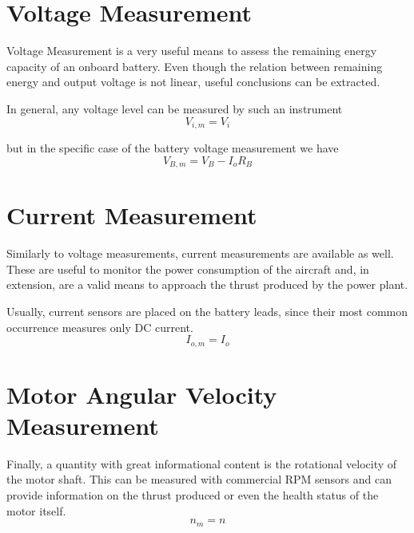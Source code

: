 \section{Voltage Measurement}
Voltage Measurement is a very useful means to assess the remaining energy capacity of an onboard battery. Even though the relation between remaining energy and output voltage is not linear, useful conclusions can be extracted.

In general, any voltage level can be measured by such an instrument
\begin{equation}
	V_{i,m} = V_i
\end{equation}

but in the specific case of the battery voltage measurement we have
\begin{equation}
	V_{B,m} = V_B - I_o R_B
\end{equation}

\section{Current Measurement}
Similarly to voltage measurements, current measurements are available as well. These are useful to monitor the power consumption of the aircraft and, in extension, are a valid means to approach the thrust produced by the power plant.

Usually, current sensors are placed on the battery leads, since their most common occurrence measures only DC current.
\begin{equation}
	I_{o,m} = I_o
\end{equation}

\section{Motor Angular Velocity Measurement}
Finally, a quantity with great informational content is the rotational velocity of the motor shaft. This can be measured with commercial RPM sensors and can provide information on the thrust produced or even the health status of the motor itself.
\begin{equation}
	n_{m} = n
\end{equation}
